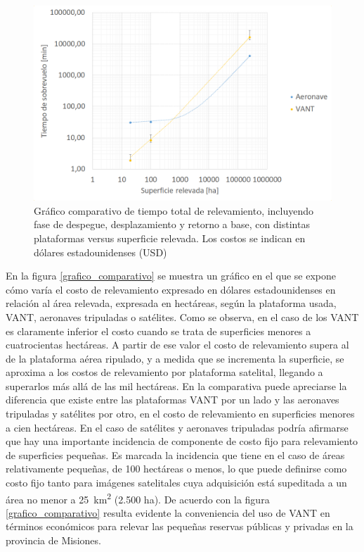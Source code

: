 \begin{figure}[h!]
    \includegraphics[width=\textwidth]{Imagenes/grafico bloque 1-II.png}
     \hfill
     \caption{Gráfico comparativo de tiempo total de relevamiento, incluyendo fase de despegue, desplazamiento y retorno a base, con distintas plataformas versus superficie relevada. Los costos se indican en dólares estadounidenses (USD)}
    \label{grafico_comparativo-II}
\end{figure}

En la figura \ref{grafico_comparativo} se muestra un gráfico en el que se expone cómo varía el costo de relevamiento expresado en dólares estadounidenses en relación al área relevada, expresada en hectáreas, según la plataforma usada, VANT, aeronaves tripuladas o satélites. Como se observa, en el caso de los VANT es claramente inferior el costo cuando se trata de superficies menores a cuatrocientas hectáreas. A partir de ese valor el costo de relevamiento supera al de la plataforma aérea ripulado, y a medida que se incrementa la superficie, se aproxima a los costos de relevamiento por plataforma satelital, llegando a superarlos más allá de las mil hectáreas. En la comparativa puede apreciarse la diferencia que existe entre las plataformas VANT por un lado y las aeronaves tripuladas y satélites por otro, en el costo de relevamiento en superficies menores a cien hectáreas. En el caso de satélites y aeronaves tripuladas podría afirmarse que hay una importante incidencia de componente de costo fijo para relevamiento de superficies pequeñas. Es marcada la incidencia que tiene en el caso de áreas relativamente pequeñas, de 100 hectáreas o menos, lo que puede definirse como costo fijo tanto para imágenes satelitales cuya adquisición está supeditada a un área no menor a \SI{25}{\kilo\metre\squared} (2.500 ha). De acuerdo con la figura \ref{grafico_comparativo} resulta evidente la conveniencia del uso de VANT en términos económicos para relevar las pequeñas reservas públicas y privadas en la provincia de Misiones.

